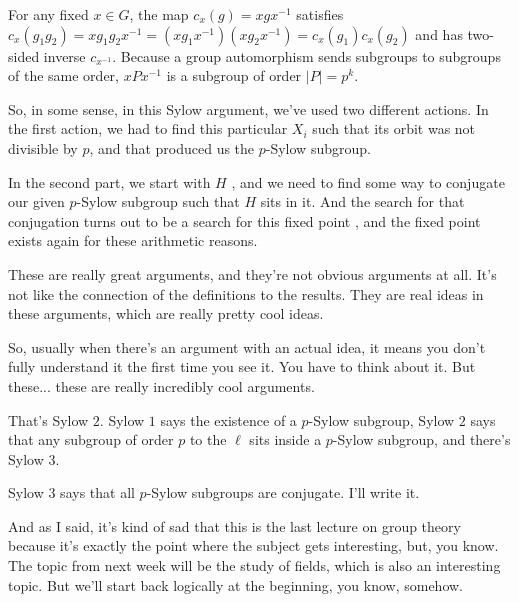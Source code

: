 \begin{proofWrapper}
\begin{content}
\begin{steps}
For any fixed $x \in G$, the map $c_x(g) = x g x^{-1}$ satisfies $c_x(g_1 g_2) = x g_1 g_2 x^{-1} = (x g_1 x^{-1})(x g_2 x^{-1}) = c_x(g_1) c_x(g_2)$ and has two-sided inverse $c_{x^{-1}}$. Because a group automorphism sends subgroups to subgroups of the same order, $x P x^{-1}$ is a subgroup of order $|P| = p^k$.
\end{steps}
\end{content}
\end{proofWrapper}

\begin{speech}[00:33:28 - 00:35:20]
So, in some sense, in this Sylow argument, we've used two different actions. In the first action, we had to find this particular $X_i$  such that its orbit was not divisible by $p$, and that produced us the $p$-Sylow subgroup.

In the second part, we start with $H$ , and we need to find some way to conjugate our given $p$-Sylow subgroup  such that $H$ sits in it. And the search for that conjugation turns out to be a search for this fixed point , and the fixed point exists again for these arithmetic reasons.

These are really great arguments, and they're not obvious arguments at all. It's not like the connection of the definitions to the results. They are real ideas in these arguments, which are really pretty cool ideas.

So, usually when there's an argument with an actual idea, it means you don't fully understand it the first time you see it. You have to think about it. But these... these are really incredibly cool arguments.

That's Sylow $2$. Sylow $1$ says the existence of a $p$-Sylow subgroup, Sylow $2$ says that any subgroup of order $p$ to the $\ell$ sits inside a $p$-Sylow subgroup, and there's Sylow $3$.

Sylow $3$ says that all $p$-Sylow subgroups are conjugate. I'll write it.

And as I said, it's kind of sad that this is the last lecture on group theory because it's exactly the point where the subject gets interesting, but, you know. The topic from next week will be the study of fields, which is also an interesting topic. But we'll start back logically at the beginning, you know, somehow.
\end{speech}

